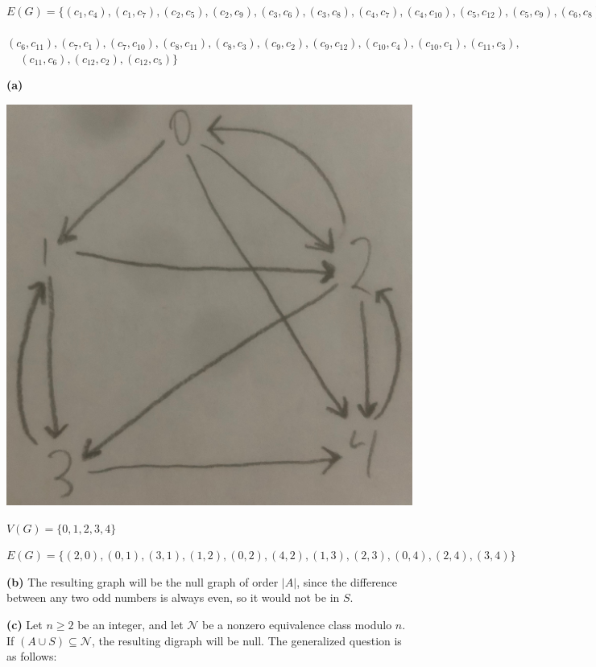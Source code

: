 \documentclass[12pt]{article}
\begin{document}
$E(G) = \{(c_1,c_4),(c_1,c_7), (c_2, c_5), (c_2,c_9), (c_3, c_6), (c_3, c_8), (c_4,c_7), (c_4,c_{10}), (c_5, c_{12}), (c_5, c_9), (c_6, c_8),$ \\
\indent\indent\indent\,\,\,\,\,\,\,$(c_6,c_{11}), (c_7, c_1), (c_7,c_{10}), (c_8,c_{11}), (c_8,c_3), (c_9, c_2), (c_9, c_{12}), (c_{10}, c_4), (c_{10}, c_1), (c_{11}, c_3),$\\
\indent\indent\indent\,\,\,\,\,\,\,$(c_{11}, c_6), (c_{12}, c_2), (c_{12}, c_5)\}$

\bigskip
{}

\textbf{(a)} 
\begin{center}
\includegraphics[scale=.1]{IMG-0765.jpg}
\end{center}

$V(G) = \{0,1,2,3,4\}$

$E(G) = \{(2,0), (0,1), (3,1), (1,2), (0,2), (4,2), (1,3), (2,3), (0,4), (2,4), (3,4)\}$

\textbf{(b)} The resulting graph will be the null graph of order $|A|$, since the difference between any two odd numbers is always even, so it would not be in $S$.

\textbf{(c)} Let $n \geq 2$ be an integer, and let $\mathcal N$ be a nonzero equivalence class modulo $n$. If $(A \cup S) \subseteq \mathcal N$, the resulting digraph will be null. The generalized question is as follows:
\end{document}
